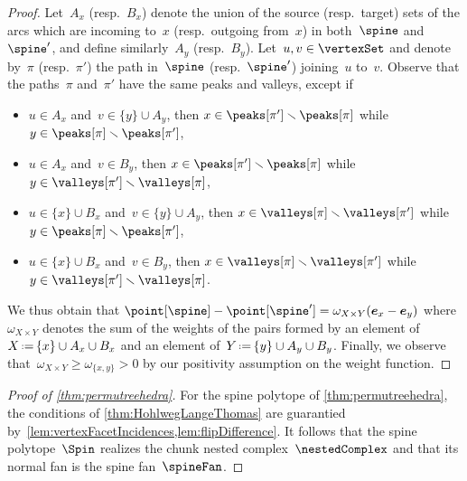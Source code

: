 \documentclass{amsart}
\theoremstyle{definition}
\newtheorem{example}[theorem]{Example}
\renewcommand{\b}[1]{{\boldsymbol{#1}}} %
\newcommand{\ssm}{\smallsetminus} %
\newcommand{\eqdef}{\mbox{\,\raisebox{0.2ex}{\scriptsize\ensuremath{\mathrm:}}\ensuremath{=}\,}} %
\newcommand{\weight}{\omega} %
\begin{document}
\begin{proof}
  Let~$A_x$ (resp.~$B_x$) denote the union of the source (resp.~target) sets of the arcs which are incoming to~$x$ (resp.~outgoing from~$x$) in both~$\spine$ and~$\spine'$, and define similarly~$A_y$ (resp.~$B_y$).
  Let~$u,v \in \vertexSet$ and denote by~$\pi$ (resp.~$\pi'$) the path in~$\spine$ (resp.~$\spine'$) joining~$u$ to~$v$.
  Observe that the paths~$\pi$ and~$\pi'$ have the same peaks and valleys, except if
  \begin{itemize}
    \item $u \in A_x$ and~$v \in \{y\} \cup A_y$, then $x \in \peaks[\pi'] \ssm \peaks[\pi]$ while~$y \in \peaks[\pi] \ssm \peaks[\pi']$,
    \item $u \in A_x$ and~$v \in B_y$, then $x \in \peaks[\pi'] \ssm \peaks[\pi]$ while~$y \in \valleys[\pi'] \ssm \valleys[\pi]$,
    \item $u \in \{x\} \cup B_x$ and~$v \in \{y\} \cup A_y$, then $x \in \valleys[\pi] \ssm \valleys[\pi']$ while~$y \in \peaks[\pi] \ssm \peaks[\pi']$,
    \item $u \in \{x\} \cup B_x$ and~$v \in B_y$, then $x \in \valleys[\pi] \ssm \valleys[\pi']$ while~$y \in \valleys[\pi'] \ssm \valleys[\pi]$.
  \end{itemize}
  We thus obtain that
  \(
    \point[\spine] - \point[\spine'] = \weight_{X \times Y} (\b{e}_x - \b{e}_y)
  \)
  where~$\weight_{X \times Y}$ denotes the sum of the weights of the pairs formed by an element of~$X \eqdef \{x\} \cup A_x \cup B_x$ and an element of~$Y \eqdef \{y\} \cup A_y \cup B_y$.
  Finally, we observe that~$\weight_{X \times Y} \ge \weight_{\{x,y\}} > 0$ by our positivity assumption on the weight function.
\end{proof}

\begin{proof}[Proof of \cref{thm:permutreehedra}]
  For the spine polytope of \cref{thm:permutreehedra}, the conditions of \cref{thm:HohlwegLangeThomas} are guarantied by~\cref{lem:vertexFacetIncidences,lem:flipDifference}.
  It follows that the spine polytope~$\Spin$ realizes the chunk nested complex~$\nestedComplex$ and that its normal fan is the spine fan~$\spineFan$.
\end{proof}

\end{document}
